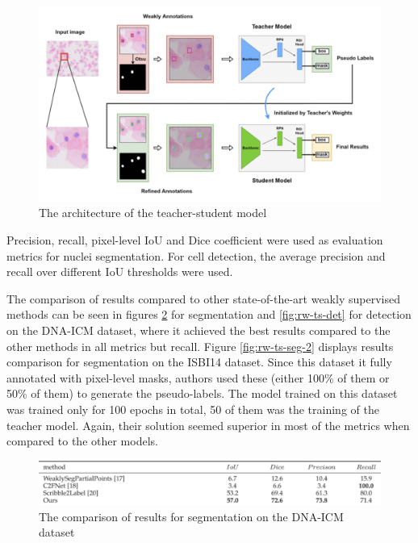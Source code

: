 \begin{figure}[H]
    \begin{centering}
    \includegraphics[width=14cm]{assets/images/rw-teacher-student.png}
    \par\end{centering}
    \caption{The architecture of the teacher-student model}
    \label{fig:rw-teacher-student}
\end{figure}

Precision, recall, pixel-level IoU and Dice coefficient were used as evaluation metrics for nuclei segmentation. For cell detection, the average precision and recall over different IoU thresholds were used.

The comparison of results compared to other state-of-the-art weakly supervised methods can be seen in figures \ref{fig:rw-ts-seg} for segmentation and \ref{fig:rw-ts-det} for detection on the DNA-ICM dataset, where it achieved the best results compared to the other methods in all metrics but recall. Figure \ref{fig:rw-ts-seg-2} displays results comparison for segmentation on the ISBI14 dataset. Since this dataset it fully annotated with pixel-level masks, authors used these (either 100\% of them or 50\% of them) to generate the pseudo-labels. The model trained on this dataset was trained only for 100 epochs in total, 50 of them was the training of the teacher model. Again, their solution seemed superior in most of the metrics when compared to the other models.

\begin{figure}[H]
    \begin{centering}
    \includegraphics[width=14cm]{assets/images/rw-ts-seg.png}
    \par\end{centering}
    \caption{The comparison of results for segmentation on the DNA-ICM dataset}
    \label{fig:rw-ts-seg}
\end{figure}

